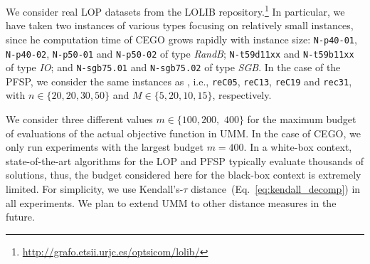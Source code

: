 \documentclass[sigconf,dvipsnames]{acmart}
\newcommand{\FEmax}{\ensuremath{m}}
\begin{document}
%
We consider real LOP datasets from the LOLIB
repository.\footnote{\url{http://grafo.etsii.urjc.es/optsicom/lolib/}} In
particular, we have taken two instances of various types focusing on relatively
small instances, since he computation time of CEGO grows rapidly with instance
size: \texttt{N-p40-01}, \texttt{N-p40-02}, \texttt{N-p50-01} and
\texttt{N-p50-02} of type \emph{RandB}; \texttt{N-t59d11xx} and
\texttt{N-t59b11xx} of type \emph{IO}; and \texttt{N-sgb75.01} and
\texttt{N-sgb75.02} of type \emph{SGB}.
In the case of the PFSP, we consider the same instances as
\citet{ZaeStoBar2014:ppsn}, i.e., \texttt{reC05}, \texttt{reC13},
\texttt{reC19} and \texttt{rec31}, with $n \in \{20, 20, 30, 50\}$ and $M \in \{5, 20, 10, 15\}$, respectively.


%
We consider three different values $\FEmax \in\{100, 200,$ $400\}$ for the maximum
budget of evaluations of the actual objective function in UMM. In the case of
CEGO, we only run experiments with the largest budget $m=400$.  In a white-box
context, state-of-the-art algorithms for the LOP and PFSP typically evaluate
thousands of solutions, thus, the budget considered here for the black-box
context is extremely limited.
%
For simplicity, we use Kendall's-$\tau$
distance~(Eq.~\ref{eq:kendall_decomp}) in all experiments.
We plan to extend UMM to other distance measures in the future.  
\end{document}
